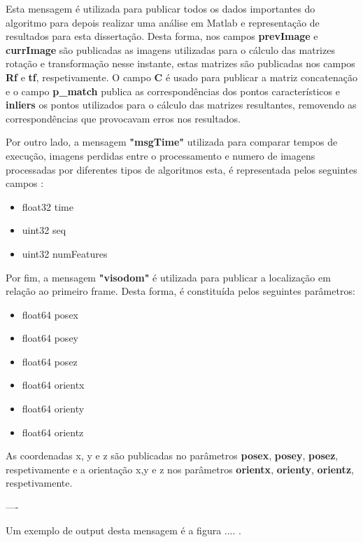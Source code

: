 Esta mensagem é utilizada para publicar todos os dados importantes do algoritmo para depois realizar uma análise em Matlab e representação de resultados para esta dissertação. 
Desta forma, nos campos \textbf{prevImage} e \textbf{currImage} são publicadas as imagens utilizadas para o cálculo das matrizes rotação e transformação nesse instante, estas matrizes são publicadas nos campos \textbf{Rf} e \textbf{tf}, respetivamente. O campo \textbf{C} é usado para publicar a matriz concatenação e o campo \textbf{p\_match} publica as correspondências dos pontos característicos e \textbf{inliers} os pontos utilizados para o cálculo das matrizes resultantes, removendo as correspondências que provocavam erros nos resultados.  


Por outro lado, a mensagem \textbf{"msgTime"} utilizada para comparar tempos de execução, imagens perdidas entre o processamento e numero de imagens processadas por diferentes tipos de algoritmos esta, é representada pelos seguintes campos :
\begin{itemize}
	\item float32 time
	
	\item uint32 seq
	\item uint32 numFeatures
\end{itemize}


Por fim, a mensagem \textbf{"visodom"} é utilizada para publicar a localização em relação ao primeiro frame. Desta forma, é constituída pelos seguintes parâmetros:

\begin{itemize}
	
	\item float64 posex
	\item float64 posey
	\item float64 posez
	
	\item float64 orientx
	\item float64 orienty
	\item float64 orientz
	
\end{itemize}

As coordenadas x, y e z são publicadas no parâmetros \textbf{posex}, \textbf{posey}, \textbf{posez}, respetivamente e a orientação x,y e z nos parâmetros \textbf{orientx}, \textbf{orienty}, \textbf{orientz}, respetivamente. 


----

Um exemplo de output desta mensagem é a figura .... .

